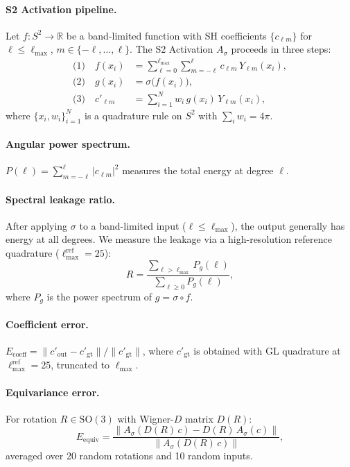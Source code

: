 \documentclass[10pt,twocolumn]{article}
\begin{document}
\paragraph{S2 Activation pipeline.}
Let $f : S^2 \to \mathbb{R}$ be a band-limited function with SH coefficients
$\{c_{\ell m}\}$ for $\ell \le \ell_{\max}$, $m \in \{-\ell,\dots,\ell\}$.
The S2 Activation $A_\sigma$ proceeds in three steps:
\begin{align}
  \text{(1)}\quad f(x_i) &= \textstyle\sum_{\ell=0}^{\ell_{\max}} \sum_{m=-\ell}^{\ell}
    c_{\ell m}\, Y_{\ell m}(x_i), \label{eq:fwd} \\
  \text{(2)}\quad g(x_i) &= \sigma\bigl(f(x_i)\bigr), \label{eq:act} \\
  \text{(3)}\quad c'_{\ell m} &= \textstyle\sum_{i=1}^{N} w_i\, g(x_i)\, Y_{\ell m}(x_i),
    \label{eq:inv}
\end{align}
where $\{x_i, w_i\}_{i=1}^N$ is a quadrature rule on $S^2$ with
$\sum_i w_i = 4\pi$.

\paragraph{Angular power spectrum.}
$P(\ell) = \sum_{m=-\ell}^{\ell} |c_{\ell m}|^2$ measures the total energy at degree
$\ell$.

\paragraph{Spectral leakage ratio.}
After applying $\sigma$ to a band-limited input ($\ell \le \ell_{\max}$), the output
generally has energy at all degrees. We measure the leakage via a high-resolution
reference quadrature ($\ell_{\max}^{\mathrm{ref}} = 25$):
\begin{equation}
  R = \frac{\sum_{\ell > \ell_{\max}} P_g(\ell)}{\sum_{\ell \ge 0} P_g(\ell)},
  \label{eq:leakage}
\end{equation}
where $P_g$ is the power spectrum of $g = \sigma \circ f$.

\paragraph{Coefficient error.}
$E_{\mathrm{coeff}} = \|c'_{\mathrm{out}} - c'_{\mathrm{gt}}\| / \|c'_{\mathrm{gt}}\|$,
where $c'_{\mathrm{gt}}$ is obtained with GL quadrature at
$\ell_{\max}^{\mathrm{ref}} = 25$, truncated to $\ell_{\max}$.

\paragraph{Equivariance error.}
For rotation $R \in \mathrm{SO}(3)$ with Wigner-$D$ matrix $D(R)$:
\begin{equation}
  E_{\mathrm{equiv}} = \frac{\|A_\sigma(D(R)\,c) - D(R)\,A_\sigma(c)\|}
  {\|A_\sigma(D(R)\,c)\|},
  \label{eq:equiv}
\end{equation}
averaged over 20 random rotations and 10 random inputs.
\end{document}
